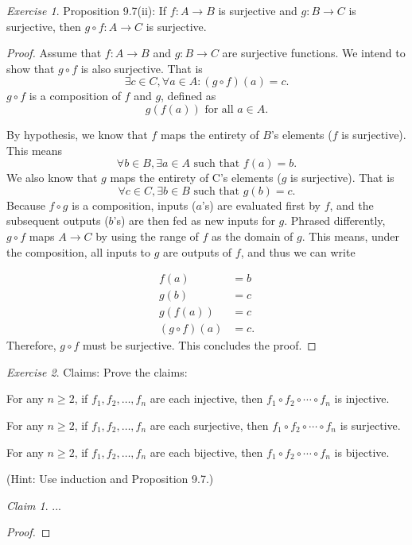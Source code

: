 \documentclass[12pt,oneside]{amsart}
\theoremstyle{remark}
\newtheorem{exer}{Exercise}
\newtheorem{claim}{Claim}[exer]
\begin{document}
\newpage
\begin{exer}
Proposition 9.7(ii): If $f: A \to B$ is surjective and $g: B \to C$ is surjective, then $g \circ f: A \to C$ is surjective.
%
\end{exer}

\begin{proof}
Assume that $f: A \to B$ and $g: B \to C$ are surjective functions. We intend to show that $g \circ f$ is also surjective. That is \[ \exists c \in C, \forall a \in A: (g \circ f)(a) = c. \] $g \circ f$ is a composition of $f$ and $g$, defined as \[ g(f(a)) \text{ for all } a \in A. \]

By hypothesis, we know that $f$ maps the entirety of $B$'s elements ($f$ is surjective). This means \[ \forall b \in B, \exists a \in A \text{ such that } f(a) = b. \] We also know that $g$ maps the entirety of C's elements ($g$ is surjective). That is \[ \forall c \in C, \exists b \in B \text{ such that } g(b) = c. \] Because $f \circ g$ is a composition, inputs ($a$'s) are evaluated first by $f$, and the subsequent outputs ($b$'s) are then fed as new inputs for $g$. Phrased differently, $g \circ f$ maps $A \to C$ by using the range of $f$ as the domain of $g$. This means, under the composition, all inputs to $g$ are outputs of $f$, and thus we can write

\begin{equation}
\begin{split}
         f(a) &= b \\
         g(b) &= c \\
      g(f(a)) &= c \\
(g \circ f)(a) &= c.
\end{split}
\end{equation}
Therefore, $g \circ f$ must be surjective. This concludes the proof.
\end{proof}

\newpage
\begin{exer}
Claims: Prove the claims:

For any $n \geq 2$, if $f_1, f_2, \dotsc, f_n$ are each injective, then $f_1 \circ f_2 \circ \dotsb \circ f_n$ is injective.

For any $n \geq 2$, if $f_1, f_2, \dotsc, f_n$ are each surjective, then $f_1 \circ f_2 \circ \dotsb \circ f_n$ is surjective.

For any $n \geq 2$, if $f_1, f_2, \dotsc, f_n$ are each bijective, then $f_1 \circ f_2 \circ \dotsb \circ f_n$ is bijective.

(Hint: Use induction and Proposition 9.7.)
\end{exer}

\begin{claim}
...
\end{claim}
\begin{proof}
\end{proof}
\end{document}

